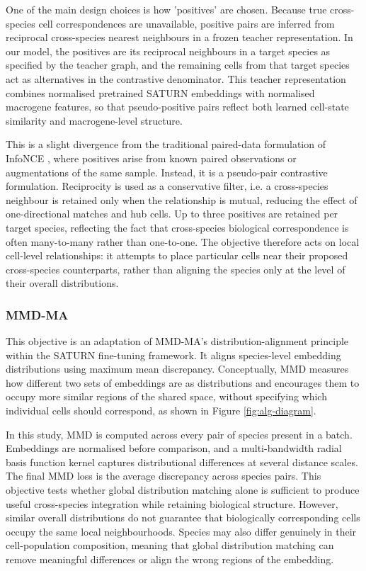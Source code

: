 \documentclass{article}
\begin{document}
One of the main design choices is how 'positives' are chosen. Because true cross-species cell correspondences are unavailable, positive pairs are inferred from reciprocal cross-species nearest neighbours in a frozen teacher representation. In our model, the positives are its reciprocal neighbours in a target species as specified by the teacher graph, and the remaining cells from that target species act as alternatives in the contrastive denominator. This teacher representation combines normalised pretrained SATURN embeddings with normalised macrogene features, so that pseudo-positive pairs reflect both learned cell-state similarity and macrogene-level structure. 

This is a slight divergence from the traditional paired-data formulation of InfoNCE \cite{InfoNCE}, where positives arise from known paired observations or augmentations of the same sample. Instead, it is a pseudo-pair contrastive formulation. Reciprocity is used as a conservative filter, i.e. a cross-species neighbour is retained only when the relationship is mutual, reducing the effect of one-directional matches and hub cells. Up to three positives are retained per target species, reflecting the fact that cross-species biological correspondence is often many-to-many rather than one-to-one. The objective therefore acts on local cell-level relationships: it attempts to place particular cells near their proposed cross-species counterparts, rather than aligning the species only at the level of their overall distributions. 

\subsubsection{MMD-MA}
This objective is an adaptation of MMD-MA’s distribution-alignment principle within the SATURN fine-tuning framework. It aligns species-level embedding distributions using maximum mean discrepancy. Conceptually, MMD measures how different two sets of embeddings are as distributions and encourages them to occupy more similar regions of the shared space, without specifying which individual cells should correspond, as shown in Figure \ref{fig:alg-diagram}.

In this study, MMD is computed across every pair of species present in a batch. Embeddings are normalised before comparison, and a multi-bandwidth radial basis function kernel captures distributional differences at several distance scales. The final MMD loss is the average discrepancy across species pairs. This objective tests whether global distribution matching alone is sufficient to produce useful cross-species integration while retaining biological structure. However, similar overall distributions do not guarantee that biologically corresponding cells occupy the same local neighbourhoods. Species may also differ genuinely in their cell-population composition, meaning that global distribution matching can remove meaningful differences or align the wrong regions of the embedding.
\end{document}
